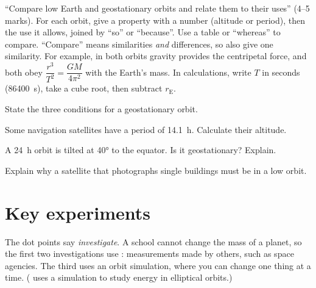 \begin{examtip}
``Compare low Earth and geostationary orbits and relate them to their uses'' (4--5 marks). For
each orbit, give a property with a number (altitude or period), then the use it allows, joined
by ``so'' or ``because''. Use a table or ``whereas'' to compare. ``Compare'' means similarities
\emph{and} differences, so also give one similarity. For example, in both orbits gravity provides
the centripetal force, and both obey $\dfrac{r^3}{T^2} = \dfrac{GM}{4\pi^2}$ with the Earth's mass.
In calculations, write $T$ in seconds (\qty{86400}{s}), take a cube root, then subtract
$r_\mathrm{E}$.
\end{examtip}

\begin{quickcheck}
  \item State the three conditions for a geostationary orbit.
  \item Some navigation satellites have a period of \qty{14.1}{h}. Calculate their altitude.
  \item A \qty{24}{h} orbit is tilted at \ang{40} to the equator. Is it geostationary? Explain.
  \item Explain why a satellite that photographs single buildings must be in a low orbit.
\end{quickcheck}

\section{Key experiments}\label{ch4:sec:experiments}

The dot points say \emph{investigate}. A school cannot change the mass of a planet, so the first
two investigations use : measurements made by others, such as space
agencies. The third uses an orbit simulation, where you can change one thing at a time.
( uses a simulation to study energy in elliptical orbits.)

